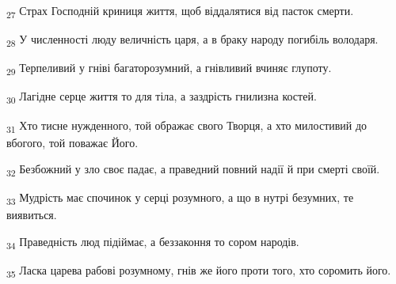\begin{tcolorbox}
\textsubscript{27} Страх Господній криниця життя, щоб віддалятися від пасток смерти.
\end{tcolorbox}
\begin{tcolorbox}
\textsubscript{28} У численності люду величність царя, а в браку народу погибіль володаря.
\end{tcolorbox}
\begin{tcolorbox}
\textsubscript{29} Терпеливий у гніві багаторозумний, а гнівливий вчиняє глупоту.
\end{tcolorbox}
\begin{tcolorbox}
\textsubscript{30} Лагідне серце життя то для тіла, а заздрість гнилизна костей.
\end{tcolorbox}
\begin{tcolorbox}
\textsubscript{31} Хто тисне нужденного, той ображає свого Творця, а хто милостивий до вбогого, той поважає Його.
\end{tcolorbox}
\begin{tcolorbox}
\textsubscript{32} Безбожний у зло своє падає, а праведний повний надії й при смерті своїй.
\end{tcolorbox}
\begin{tcolorbox}
\textsubscript{33} Мудрість має спочинок у серці розумного, а що в нутрі безумних, те виявиться.
\end{tcolorbox}
\begin{tcolorbox}
\textsubscript{34} Праведність люд підіймає, а беззаконня то сором народів.
\end{tcolorbox}
\begin{tcolorbox}
\textsubscript{35} Ласка царева рабові розумному, гнів же його проти того, хто соромить його.
\end{tcolorbox}
